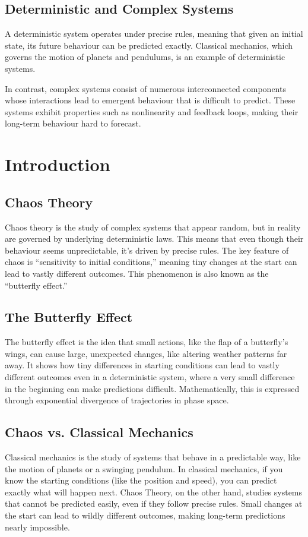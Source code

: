 \documentclass[12pt]{article}
\begin{document}
\subsection{Deterministic and Complex Systems}
A deterministic system operates under precise rules, meaning that given an initial state, its future behaviour can be predicted exactly. Classical mechanics, which governs the motion of planets and pendulums, is an example of deterministic systems.

In contrast, complex systems consist of numerous interconnected components whose interactions lead to emergent behaviour that is difficult to predict. These systems exhibit properties such as nonlinearity and feedback loops, making their long-term behaviour hard to forecast.

\section{Introduction}


\subsection{Chaos Theory}
Chaos theory is the study of complex systems that appear random, but in reality are governed by underlying deterministic laws. This means that even though their behaviour seems unpredictable, it's driven by precise rules. The key feature of chaos is ``sensitivity to initial conditions,'' meaning tiny changes at the start can lead to vastly different outcomes. This phenomenon is also known as the ``butterfly effect.''

\subsection{The Butterfly Effect}
The butterfly effect is the idea that small actions, like the flap of a butterfly’s wings, can cause large, unexpected changes, like altering weather patterns far away. It shows how tiny differences in starting conditions can lead to vastly different outcomes even in a deterministic system, where a very small difference in the beginning can make predictions difficult. Mathematically, this is expressed through exponential divergence of trajectories in phase space.

\subsection{Chaos vs. Classical Mechanics}
Classical mechanics is the study of systems that behave in a predictable way, like the motion of planets or a swinging pendulum. In classical mechanics, if you know the starting conditions (like the position and speed), you can predict exactly what will happen next. Chaos Theory, on the other hand, studies systems that cannot be predicted easily, even if they follow precise rules. Small changes at the start can lead to wildly different outcomes, making long-term predictions nearly impossible.
\end{document}
